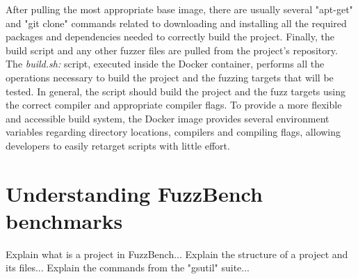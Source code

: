 \documentclass[Lau,oneside]{sapthesis}%
\begin{document}
\newline
After pulling the most appropriate base image, there are usually several "apt-get" and "git clone" commands related to downloading and installing all the required packages and dependencies needed to correctly build the project.
\newline
Finally, the build script and any other fuzzer files are pulled from the project's repository.
\newline \newline
The \textit{build.sh:} script, executed inside the Docker container, performs all the operations necessary to build the project and the fuzzing targets that will be tested.
\newline
In general, the script should build the project and the fuzz targets using the correct compiler and appropriate compiler flags.
\newline
To provide a more flexible and accessible build system, the Docker image provides several environment variables regarding directory locations, compilers and compiling flags, allowing developers to easily retarget scripts with little effort.




\newpage
\section{Understanding FuzzBench benchmarks}
Explain what is a project in FuzzBench...
\newline \newline
Explain the structure of a project and its files...
\newline \newline
Explain the commands from the "gsutil" suite...




\newpage
\end{document}
